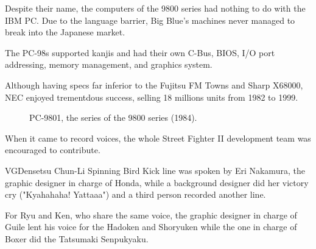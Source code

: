 Despite their name, the computers of the 9800 series had nothing to do with the IBM PC. Due to the language barrier, Big Blue's machines never managed to break into the Japanese market.

The PC-98s supported kanjis and had their own C-Bus, BIOS, I/O port addressing, memory management, and graphics system. 

Although having specs far inferior to the Fujitsu FM Towns and Sharp X68000, NEC enjoyed trementdous success, selling 18 millions units from 1982 to 1999.

\begin{figure}[H]
\caption*{PC-9801, the series of the 9800 series (1984).}
\end{figure}





When it came to record voices, the whole Street Fighter II development team was encouraged to contribute.

\begin{q}{VGDensetsu\cite{sf2samples}  }
Chun-Li Spinning Bird Kick line was spoken by Eri Nakamura, the graphic designer in charge of Honda, while a background designer did her victory cry ("Kyahahaha! Yattaaa") and a third person recorded another line.

For Ryu and Ken, who share the same voice, the graphic designer in charge of Guile lent his voice for the Hadoken and Shoryuken while the one in charge of Boxer did the Tatsumaki Senpukyaku.  
\end{q}




